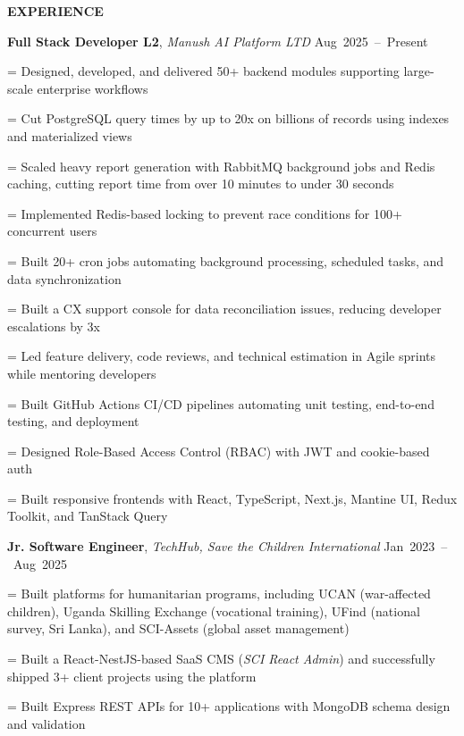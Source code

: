 \documentclass[a4paper]{article}
\newcommand{\sectionfont}{%
  \fontsize{12pt}{14pt}\selectfont\bfseries
}
\newlength{\listindent}
\newcommand{\sectiontitle}[1]{%
  \par
  \vspace{14pt}
  {\sectionfont #1}\par
  \vspace{6pt}
}
\newlength{\bulletgap}
\newcommand{\resumebullet}[1]{%
  \begingroup
  \leftskip=\listindent
  \parindent=0pt
  \noindent
  \llap{%
    \raisebox{0.15ex}{%
      \fontsize{7}{7}\selectfont -
    }%
    \hspace{6pt}%
  }%
  #1\par
  \endgroup
  \vspace{\bulletgap}%
}
\newcommand{\experienceheader}[3]{%
  \noindent
  \textbf{#1}, \textit{#2}%
  \hfill
  \mbox{#3}%
  \par
  \vspace{1pt}
}
\begin{document}
\sectiontitle{EXPERIENCE}

\experienceheader
{Full Stack Developer L2}
{Manush AI Platform LTD}
{Aug 2025 -- Present}

\resumebullet{Designed, developed, and delivered 50+ backend modules supporting large-scale enterprise workflows}

\resumebullet{Cut PostgreSQL query times by up to 20x on billions of records using indexes and materialized views}

\resumebullet{Scaled heavy report generation with RabbitMQ background jobs and Redis caching, cutting report time from over 10 minutes to under 30 seconds}



\resumebullet{Implemented Redis-based locking to prevent race conditions for 100+ concurrent users}

\resumebullet{Built 20+ cron jobs automating background processing, scheduled tasks, and data synchronization}

\resumebullet{Built a CX support console for data reconciliation issues, reducing developer escalations by 3x}

\resumebullet{Led feature delivery, code reviews, and technical estimation in Agile sprints while mentoring developers}

\resumebullet{Built GitHub Actions CI/CD pipelines automating unit testing, end-to-end testing, and deployment}

\resumebullet{Designed Role-Based Access Control (RBAC) with JWT and cookie-based auth}


\resumebullet{Built responsive frontends with React, TypeScript, Next.js, Mantine UI, Redux Toolkit, and TanStack Query}

\vspace{13pt}

\experienceheader
{Jr. Software Engineer}
{TechHub, Save the Children International}
{Jan 2023 -- Aug 2025}

\resumebullet{Built platforms for humanitarian programs, including UCAN (war-affected children), Uganda Skilling Exchange (vocational training), UFind (national survey, Sri Lanka), and SCI-Assets (global asset management)}

\resumebullet{Built a React-NestJS-based SaaS CMS (\textit{SCI React Admin}) and successfully shipped 3+ client projects using the platform}

\resumebullet{Built Express REST APIs for 10+ applications with MongoDB schema design and validation}
\end{document}
